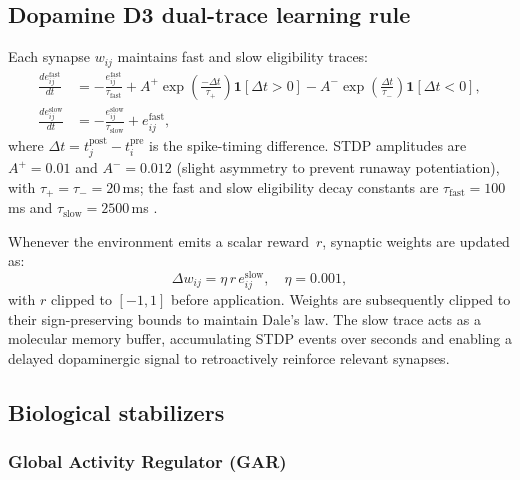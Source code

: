 \documentclass[journal,twocolumn]{IEEEtran}
\begin{document}
\subsection{Dopamine D3 dual-trace learning rule}

Each synapse $w_{ij}$ maintains fast and slow eligibility traces:
\begin{align}
\frac{de_{ij}^{\mathrm{fast}}}{dt} &=
  -\frac{e_{ij}^{\mathrm{fast}}}{\tau_{\mathrm{fast}}}
  + A^{+}\exp\!\!\left(\tfrac{-\Delta t}{\tau_{+}}\right)\mathbf{1}[\Delta t>0]
  - A^{-}\exp\!\!\left(\tfrac{\Delta t}{\tau_{-}}\right)\mathbf{1}[\Delta t<0],
  \label{eq:fast}\\
\frac{de_{ij}^{\mathrm{slow}}}{dt} &=
  -\frac{e_{ij}^{\mathrm{slow}}}{\tau_{\mathrm{slow}}}
  + e_{ij}^{\mathrm{fast}},
  \label{eq:slow}
\end{align}
where $\Delta t = t_j^{\mathrm{post}} - t_i^{\mathrm{pre}}$ is the
spike-timing difference.  STDP amplitudes are $A^{+} = 0.01$ and
$A^{-} = 0.012$ (slight asymmetry to prevent runaway potentiation),
with $\tau_{+} = \tau_{-} = 20$\,ms; the fast and slow eligibility
decay constants are $\tau_{\mathrm{fast}} = 100$\,ms and
$\tau_{\mathrm{slow}} = 2500$\,ms \cite{Florian2007rstdp}.

Whenever the environment emits a scalar reward~$r$, synaptic weights
are updated as:
\begin{equation}
\Delta w_{ij} = \eta\, r\, e_{ij}^{\mathrm{slow}},
\quad \eta = 0.001,
\label{eq:weight_update}
\end{equation}
with $r$ clipped to $[-1, 1]$ before application.  Weights are
subsequently clipped to their sign-preserving bounds to maintain
Dale's law.  The slow trace acts as a molecular memory buffer,
accumulating STDP events over seconds and enabling a delayed
dopaminergic signal to retroactively reinforce relevant synapses.

\subsection{Biological stabilizers}

\subsubsection{Global Activity Regulator (GAR)}
\label{sec:gar}
\end{document}
